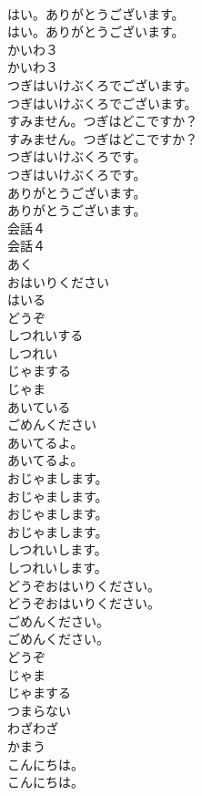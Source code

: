 \documentclass[8pt]{extreport}
\begin{document}
\begin{CJK}{UTF8}{min}
\\	はい。ありがとうございます。	
\\	はい。ありがとうございます。 
\\	かいわ３	
\\	かいわ３ 
\\	つぎはいけぶくろでございます。	
\\	つぎはいけぶくろでございます。 
\\	すみません。つぎはどこですか？	
\\	すみません。つぎはどこですか？ 
\\	つぎはいけぶくろです。	
\\	つぎはいけぶくろです。 
\\	ありがとうございます。	
\\	ありがとうございます。 
\\	会話４	
\\	会話４ 
\\	あく
\\	おはいりください
\\	はいる
\\	どうぞ
\\	しつれいする
\\	しつれい
\\	じゃまする
\\	じゃま
\\	あいている
\\	ごめんください
\\	あいてるよ。	
\\	あいてるよ。 
\\	おじゃまします。	
\\	おじゃまします。 
\\	おじゃまします。	
\\	おじゃまします。 
\\	しつれいします。	
\\	しつれいします。 
\\	どうぞおはいりください。	
\\	どうぞおはいりください。 
\\	ごめんください。	
\\	ごめんください。 
\\	どうぞ
\\	じゃま
\\	じゃまする
\\	つまらない
\\	わざわざ
\\	かまう
\\	こんにちは。	
\\	こんにちは。 

\end{CJK}
\end{document}
